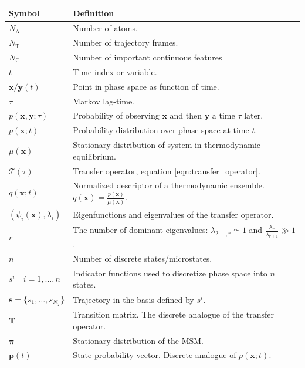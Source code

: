 \begin{table}
    \centering
    \begin{tabularx}{0.9\textwidth}{ |l| >{\raggedright\arraybackslash}X | } 
        \hline
        \textbf{Symbol}  &  \textbf{Definition} \\
        \hline\hline
        $N_{\mathrm{A}}$ & Number of atoms. \\
        $N_{\mathrm{T}}$ & Number of trajectory frames. \\
        $N_{\mathrm{C}}$ & Number of important continuous features  \\
        $t$ & Time index or variable. \\
        $\mathbf{x}/\mathbf{y}(t)$ & Point in phase space as function of time. \\
        $\tau$ & Markov lag-time. \\
        $p(\mathbf{x}, \mathbf{y}; \tau)$ & Probability of observing $\mathbf{x}$ and then $\mathbf{y}$ a time $\tau$ later. \\
        $p(\mathbf{x}; t)$ & Probability distribution over phase space at time $t$. \\
        $\mu(\mathbf{x})$ & Stationary distribution of system in thermodynamic equilibrium.  \\ 
        $\mathcal{T}(\tau)$ & Transfer operator, equation \ref{eqn:transfer_operator}.  \\
        $q(\mathbf{x}; t)$ & Normalized descriptor of a thermodynamic ensemble. $q(\mathbf{x}) = \frac{p(\mathbf{x})}{\mu(\mathbf{x})}$. \\
        $(\psi_{i}(\mathbf{x}), \lambda_{i})$ & Eigenfunctions and eigenvalues of the transfer operator.  \\
        $r$ & The number of dominant eigenvalues: $\lambda_{2,\ldots, r}\simeq 1$ and $\frac{\lambda_{r}}{\lambda_{r+1}} \gg 1$. \\
        $n$ & Number of discrete states/microstates.\\
        $s^{i}\quad i = 1, \ldots, n$ & Indicator functions used to discretize phase space into $n$ states.  \\
        $\mathbf{s} = \{s_{1}, \ldots, s_{N_{T}}\} $ & Trajectory in the basis defined by $s^{i}$. \\
        $\mathbf{T}$ & Transition matrix. The discrete analogue of the transfer operator. \\
        $\bm{\pi}$ & Stationary distribution of the MSM. \\
        $\mathbf{p}(t)$ & State probability vector. Discrete analogue of $p(\mathbf{x}; t)$. \\

\end{tabularx}
\end{table}

